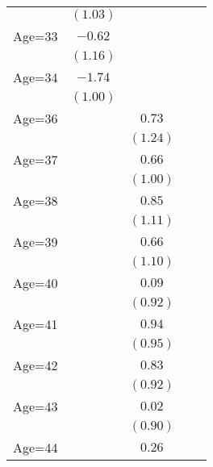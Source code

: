 \documentclass[fullpage]{paper}
\begin{document}
\begin{center}
\begin{longtable}{l c c c c }
            & $(1.03)$      &               &               &               \\
Age=33      & $-0.62$       &               &               &               \\
            & $(1.16)$      &               &               &               \\
Age=34      & $-1.74$       &               &               &               \\
            & $(1.00)$      &               &               &               \\
Age=36      &               & $0.73$        &               &               \\
            &               & $(1.24)$      &               &               \\
Age=37      &               & $0.66$        &               &               \\
            &               & $(1.00)$      &               &               \\
Age=38      &               & $0.85$        &               &               \\
            &               & $(1.11)$      &               &               \\
Age=39      &               & $0.66$        &               &               \\
            &               & $(1.10)$      &               &               \\
Age=40      &               & $0.09$        &               &               \\
            &               & $(0.92)$      &               &               \\
Age=41      &               & $0.94$        &               &               \\
            &               & $(0.95)$      &               &               \\
Age=42      &               & $0.83$        &               &               \\
            &               & $(0.92)$      &               &               \\
Age=43      &               & $0.02$        &               &               \\
            &               & $(0.90)$      &               &               \\
Age=44      &               & $0.26$        &               &               \\

\end{longtable}
\end{center}
\end{document}
